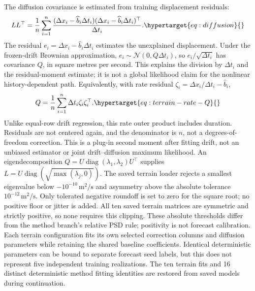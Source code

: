 The diffusion covariance is estimated from training displacement residuals:
\begin{equation}
 LL^\top=\frac{1}{n}\sum_{i=1}^n
 \frac{(\Delta x_i-\widehat b_i\Delta t_i)
       (\Delta x_i-\widehat b_i\Delta t_i)^\top}{\Delta t_i}.
 \label{eq:diffusion}\hypertarget{eq:diffusion}{}
\end{equation}
The residual \(e_i=\Delta x_i-\widehat b_i\Delta t_i\) estimates the
unexplained displacement. Under the frozen-drift Brownian approximation,
\(e_i\sim\mathcal N(0,Q\Delta t_i)\), so
\(e_i/\sqrt{\Delta t_i}\) has covariance \(Q\), in square metres per second.
This explains the division by \(\Delta t_i\) and the residual-moment estimate;
it is not a global likelihood claim for the nonlinear history-dependent path.
Equivalently, with rate residual
\(\zeta_i=\Delta x_i/\Delta t_i-\widehat b_i\),
\begin{equation}
 Q=\frac1n\sum_{i=1}^n\Delta t_i\zeta_i\zeta_i^\top.
 \label{eq:terrain-rate-Q}\hypertarget{eq:terrain-rate-Q}{}
\end{equation}
Unlike equal-row drift regression, this rate outer product includes duration.
Residuals are not centered again, and the denominator is \(n\), not a
degrees-of-freedom correction. This is a plug-in second moment after fitting
drift, not an unbiased estimator or joint drift--diffusion maximum likelihood.
An eigendecomposition \(Q=U\operatorname{diag}(\lambda_1,\lambda_2)U^\top\)
supplies \(L=U\operatorname{diag}(\sqrt{\max(\lambda_j,0)})\).
The saved terrain loader rejects a smallest eigenvalue below
\(-10^{-10}\,\mathrm{m}^2/\mathrm{s}\) and asymmetry above the absolute
tolerance \(10^{-12}\,\mathrm{m}^2/\mathrm{s}\). Only tolerated negative
roundoff is set to zero for the square root; no positive floor or jitter is
added. All ten saved terrain matrices are symmetric and strictly positive,
so none requires this clipping. These absolute thresholds differ from the
method branch's relative PSD rule; positivity is not forecast calibration.
Each terrain configuration fits its own selected correction columns and
diffusion parameters while retaining the shared baseline coefficients.
Identical deterministic parameters can be bound to separate forecast seed
labels, but this does not represent five independent training realizations.
The ten terrain fits and 16 distinct deterministic method fitting identities
are restored from saved models during continuation.

